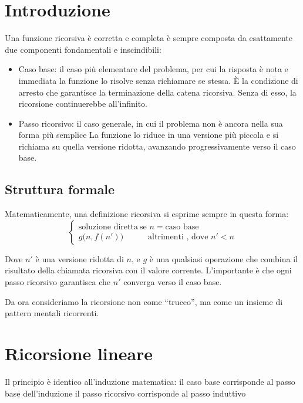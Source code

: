 \intro{}


\section{Introduzione}


Una funzione ricorsiva è corretta e completa è sempre composta da esattamente due componenti fondamentali e inscindibili:

\begin{itemize}
    \item Caso base: il caso più elementare del problema, per cui la risposta è nota e immediata  la funzione lo risolve senza richiamare se stessa. È la condizione di arresto che garantisce la terminazione della catena ricorsiva. Senza di esso, la ricorsione continuerebbe all'infinito.
    \item Passo ricorsivo: il caso generale, in cui il problema non è ancora nella sua forma più semplice La funzione lo riduce in una versione più piccola e si richiama su quella versione ridotta, avanzando progressivamente verso il caso base.
\end{itemize}
\subsection{Struttura formale}
Matematicamente, una definizione ricorsiva si esprime sempre in questa forma:
\[
\begin{cases}
    \text{soluzione diretta} \ \text{se } n=\text{caso base}\\
    g\bigl(n,f(n')\bigr) \qquad \quad \text{altrimenti , dove } n'<n
\end{cases}
\]

Dove $n'$ è una versione ridotta di $n$, e $g$ è una qualsiasi operazione che combina il risultato della chiamata ricorsiva con il valore corrente. L'importante è che ogni passo ricorsivo garantisca che $n'$ converga verso il  caso base.


Da ora consideriamo la ricorsione non come “trucco”, ma come un insieme di pattern mentali ricorrenti.

\section{Ricorsione lineare}
Il principio è identico all'induzione matematica: il caso base corrisponde al passo base dell'induzione il passo ricorsivo corrisponde al passo induttivo

